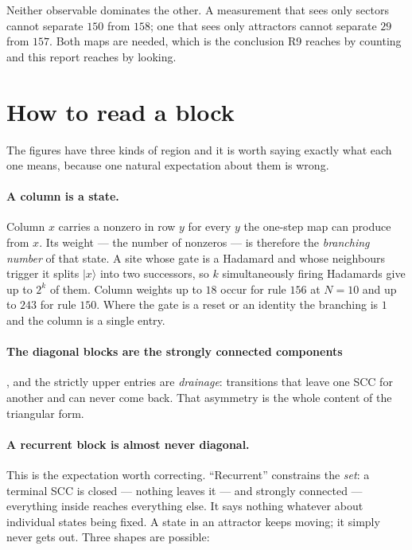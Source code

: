\documentclass[11pt]{article}
\providecommand{\ket}[1]{|#1\rangle}
\theoremstyle{plain}
\theoremstyle{definition}
\begin{document}
\noindent Neither observable dominates the other. A measurement that sees only
sectors cannot separate $150$ from $158$; one that sees only attractors cannot
separate $29$ from $157$. Both maps are needed, which is the conclusion R9
reaches by counting and this report reaches by looking.

\section{How to read a block}
\label{sec:reading}

The figures have three kinds of region and it is worth saying exactly what each
one means, because one natural expectation about them is wrong.

\paragraph{A column is a state.} Column $x$ carries a nonzero in row $y$ for
every $y$ the one-step map can produce from $x$. Its weight --- the number of
nonzeros --- is therefore the \emph{branching number} of that state. A site whose
gate is a Hadamard and whose neighbours trigger it splits $\ket{x}$ into two
successors, so $k$ simultaneously firing Hadamards give up to $2^k$ of them.
Column weights up to $18$ occur for rule $156$ at $N=10$ and up to $243$ for rule
$150$. Where the gate is a reset or an identity the branching is $1$ and the
column is a single entry.

\paragraph{The diagonal blocks are the strongly connected components}, and the
strictly upper entries are \emph{drainage}: transitions that leave one SCC for
another and can never come back. That asymmetry is the whole content of the
triangular form.

\paragraph{A recurrent block is almost never diagonal.} This is the expectation
worth correcting. ``Recurrent'' constrains the \emph{set}: a terminal SCC is
closed --- nothing leaves it --- and strongly connected --- everything inside
reaches everything else. It says nothing whatever about individual states being
fixed. A state in an attractor keeps moving; it simply never gets out. Three
shapes are possible:
\end{document}
